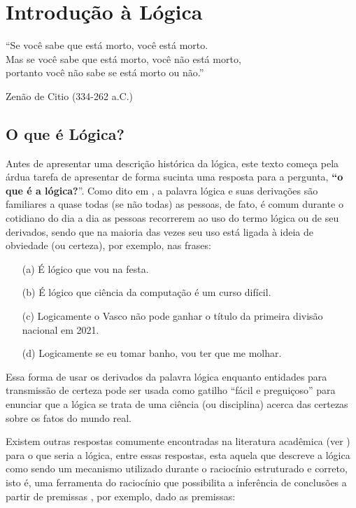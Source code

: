 \chapter{Introdução à Lógica}\label{cap:IntroLogic}

\epigraph{``Se você sabe que está morto, você está morto.\\ Mas se você sabe que está morto, você não está morto,\\ portanto você não sabe se está morto ou não.''}{Zenão de Citio (334-262 a.C.)}

\section{O que é Lógica?}\label{sec:WhatIsLogic}

Antes de apresentar uma descrição histórica da lógica, este texto começa pela árdua tarefa de apresentar de forma sucinta uma resposta para a pergunta, \textbf{``o que é a lógica?}''. Como dito em \cite{benja-Logica, copi1981}, a palavra lógica e suas derivações são familiares a quase todas (se não todas) as pessoas, de fato, é comum durante o cotidiano do dia a dia as pessoas recorrerem ao uso do termo lógica ou de seu derivados, sendo que na maioria das vezes seu uso está ligada à ideia de obviedade (ou certeza), por exemplo, nas frases:

\begin{itemize}
	\item[(a)] É lógico que vou na festa.
	\item[(b)] É lógico que ciência da computação é um curso difícil.
	\item[(c)] Logicamente o Vasco não pode ganhar o título da primeira divisão nacional em 2021.
	\item[(d)] Logicamente se eu tomar banho, vou ter que me molhar.
\end{itemize}

Essa forma de usar os derivados da palavra lógica enquanto entidades para transmissão de certeza pode ser usada como gatilho ``fácil e preguiçoso'' para enunciar que a lógica se trata de uma ciência (ou disciplina) acerca das certezas sobre os fatos do mundo real.

Existem outras respostas comumente encontradas na literatura acadêmica (ver \cite{abe2002-logica, benja-Logica, joaoPavao2014}) para o que seria a lógica, entre essas respostas, esta aquela que descreve a lógica como sendo um mecanismo utilizado durante o raciocínio estruturado e correto, isto é, uma ferramenta do raciocínio que possibilita a inferência de conclusões a partir de premissas \cite{abe2002-logica, copi1981, hodges1997}, por exemplo, dado as premissas:

